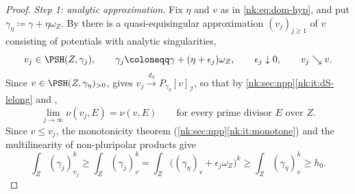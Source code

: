\begin{proof}
\emph{Step 1: analytic approximation.}
Fix $\eta$ and $v$ as in \eqref{nk:eq:dom-hyp}, and put
$\gamma_\eta\coloneqq \gamma+\eta\omega_Z$. By \cite[Theorem~1.6.2]{SGPT}
there is a quasi-equisingular approximation $(v_j)_{j\ge1}$ of $v$
consisting of potentials with analytic singularities,
\[
  v_j\in\PSH(Z,\gamma_j),\qquad
  \gamma_j\coloneqq \gamma+(\eta+\epsilon_j)\omega_Z,\qquad
  \epsilon_j\downarrow0,\qquad v_j\searrow v.
\]
Since $v\in\PSH(Z,\gamma_\eta)_{>0}$, \cite[Corollary~7.1.2]{SGPT}
gives $v_j\xrightarrow{{d_S}}P_{\gamma_\eta}[v]_\mathcal I$, so that by
\cref{nk:sec:npp}\ref{nk:it:dS-lelong} and
\cite[Propositions~3.2.1 and~3.2.6]{SGPT},
\begin{equation}\label{nk:eq:dom-lelong-conv}
  \lim_{j\to\infty}\nu(v_j,E)=\nu(v,E)
  \qquad\text{for every prime divisor $E$ over $Z$}.
\end{equation}
Since $v\le v_j$, the monotonicity theorem
(\cref{nk:sec:npp}\ref{nk:it:monotone}) and the multilinearity of non-pluripolar
products give
\begin{equation}\label{nk:eq:dom-mass}
  \int_Z(\gamma_j)_{v_j}^k
  \ge\int_Z(\gamma_j)_{v}^k
  =\int_Z\bigl((\gamma_\eta)_v+\epsilon_j\omega_Z\bigr)^k
  \ge\int_Z(\gamma_\eta)_v^k\ge h_0.
\end{equation}


\end{proof}
